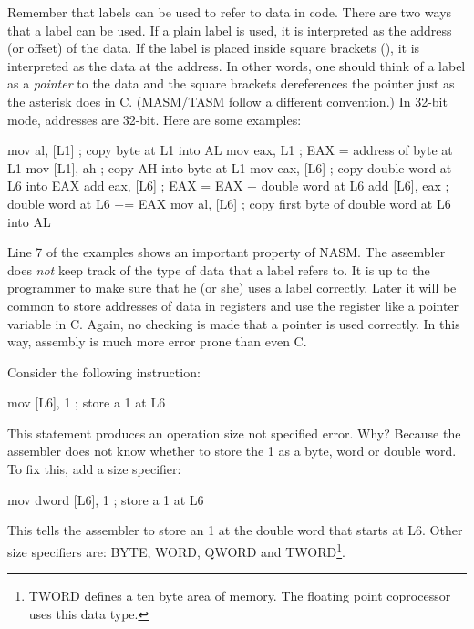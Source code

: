 Remember that labels  can be used to refer to data in code. There are
two ways that a label can be used. If a plain label is used, it is
interpreted as the address (or offset) of the data. If the label is
placed inside square brackets ({\code []}), it is interpreted as the data at
the address. In other words, one should think of a label as a \emph{pointer}
to the data and the square brackets dereferences the pointer just as
the asterisk does in C. (MASM/TASM follow a different convention.)
In 32-bit mode, addresses are 32-bit. Here are some examples:
\begin{AsmCodeListing}[frame=none]
      mov    al, [L1]      ; copy byte at L1 into AL
      mov    eax, L1       ; EAX = address of byte at L1
      mov    [L1], ah      ; copy AH into byte at L1
      mov    eax, [L6]     ; copy double word at L6 into EAX
      add    eax, [L6]     ; EAX = EAX + double word at L6
      add    [L6], eax     ; double word at L6 += EAX
      mov    al, [L6]      ; copy first byte of double word at L6 into AL
\end{AsmCodeListing}
Line 7 of the examples shows an important property of NASM. The assembler does
\emph{not} keep track of the type of data that a label refers to. It is up
to the programmer to make sure that he (or she) uses a label correctly. Later
it will be common to store addresses of data in registers and use the register
like a pointer variable in C. Again, no checking is made that a pointer is
used correctly. In this way, assembly is much more error prone than even C.

Consider the following instruction:
\begin{AsmCodeListing}[frame=none, numbers=none]
      mov    [L6], 1             ; store a 1 at L6
\end{AsmCodeListing}
This statement produces an {\code operation size not specified} error. Why?
Because the assembler does not know whether to store the 1 as a byte, word
or double word. To fix this, add a size specifier:
\begin{AsmCodeListing}[frame=none, numbers=none]
      mov    dword [L6], 1       ; store a 1 at L6
\end{AsmCodeListing}
This tells the assembler to store an 1 at the double word that starts at
{\code L6}. Other size specifiers are: {\code BYTE}, {\code WORD},
{\code QWORD} and {\code TWORD}\footnote{{\code TWORD} defines a ten byte
area of memory. The floating point coprocessor uses this data type.}.

